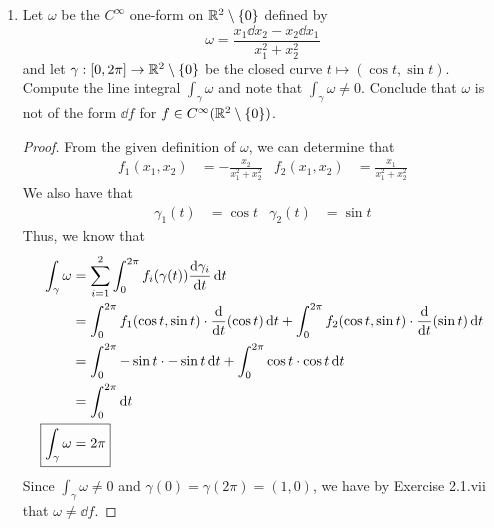 \documentclass[../psets.tex]{subfiles}
\begin{document}
\begin{enumerate}[label={\textbf{2.1.\roman*.}}]
\begin{proof}
\begin{align*}
            &= f(\gamma(b))-f(\gamma(a))
        \end{align*}
        as desired.\par
        Now suppose that $\gamma$ is a closed curve. Then
        \begin{align*}
            \int_\gamma\omega &= f(\gamma(b))-f(\gamma(a))\\
            &= f(\gamma(a))-f(\gamma(a))\\
            &= 0
        \end{align*}
        as desired.
    \end{proof}
    \item Let $\omega$ be the $C^\infty$ one-form on $\mathbb{R}^2\setminus\{0\}$ defined by
    \begin{equation*}
        \omega = \frac{x_1\dd{x_2}-x_2\dd{x_1}}{x_1^2+x_2^2}
    \end{equation*}
    and let $\gamma:[0,2\pi]\to\mathbb{R}^2\setminus\{0\}$ be the closed curve $t\mapsto(\cos t,\sin t)$. Compute the line integral $\int_\gamma\omega$ and note that $\int_\gamma\omega\neq 0$. Conclude that $\omega$ is not of the form $\dd{f}$ for $f\in C^\infty(\mathbb{R}^2\setminus\{0\})$.
    \begin{proof}
        From the given definition of $\omega$, we can determine that
        \begin{align*}
            f_1(x_1,x_2) &= -\frac{x_2}{x_1^2+x_2^2}&
            f_2(x_1,x_2) &= \frac{x_1}{x_1^2+x_2^2}
        \end{align*}
        We also have that
        \begin{align*}
            \gamma_1(t) &= \cos t&
            \gamma_2(t) &= \sin t
        \end{align*}
        Thus, we know that
        \begin{align*}
            \int_\gamma\omega &= \sum_{i=1}^2\int_0^{2\pi}f_i(\gamma(t))\dv{\gamma_i}{t}\dd{t}\\
            &= \int_0^{2\pi}f_1(\cos t,\sin t)\cdot\dv{t}(\cos t)\dd{t}+\int_0^{2\pi}f_2(\cos t,\sin t)\cdot\dv{t}(\sin t)\dd{t}\\
            &= \int_0^{2\pi}-\sin t\cdot -\sin t\dd{t}+\int_0^{2\pi}\cos t\cdot\cos t\dd{t}\\
            &= \int_0^{2\pi}\dd{t}\\
            \Aboxed{\int_\gamma\omega &= 2\pi}
        \end{align*}
        Since $\int_\gamma\omega\neq 0$ and $\gamma(0)=\gamma(2\pi)=(1,0)$, we have by Exercise 2.1.vii that $\omega\neq\dd f$.
    \end{proof}
\end{enumerate}
\end{document}
